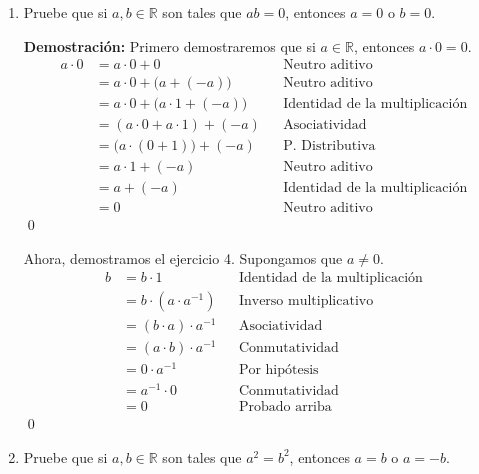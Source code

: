 \documentclass[11pt]{article}
\newcommand{\R}{\mathbb{R}}
\begin{document}
\begin{enumerate}
\pagebreak

\item Pruebe que si $a,b\in \R$ son tales que $ab=0$, entonces $a=0$ o $b=0$.

\textbf{Demostración:} Primero demostraremos que si $a\in \R$, entonces $a\cdot 0=0$.
\begin{align*}
  a\cdot0&=a\cdot0+0 && \text{Neutro aditivo}\\
  &=a\cdot0+\bigl(a+\left(-a\right)\bigr) && \text{Neutro aditivo}\\
  &=a\cdot0+\bigl(a\cdot1+\left(-a\right)\bigr) && \text{Identidad de la multiplicación}\\
  &=\left(a\cdot0+a\cdot1\right)+\left(-a\right) && \text{Asociatividad}\\
  &=\bigl(a\cdot\left(0+1\right)\bigr)+\left(-a\right) && \text{P. Distributiva}\\
  &=a\cdot1+\left(-a\right) && \text{Neutro aditivo}\\
  &=a+\left(-a\right) && \text{Identidad de la multiplicación}\\
  &=0 && \text{Neutro aditivo}
\end{align*} \qed

Ahora, demostramos el ejercicio 4. Supongamos que $a\neq 0$. \begin{align*}
  b &= b \cdot 1	&& \text{Identidad de la multiplicación} \\
  &= b \cdot  \left(a \cdot a^{-1}  \right) 	&& \text{Inverso multiplicativo} \\
  &= \left(b \cdot a \right)  \cdot a^{-1}	&& \text{Asociatividad} \\
  &= \left(a \cdot b \right)  \cdot a^{-1}	&& \text{Conmutatividad} \\
  &= 0 \cdot a^{-1}	&& \text{Por hipótesis}\\
  &= a^{-1} \cdot 0	&& \text{Conmutatividad}\\
  &= 0 && \text{Probado arriba}
\end{align*} \qed

\item Pruebe que si $a,b\in \R$ son tales que $a^2=b^2$, entonces $a=b$ o $a=-b$.


\end{enumerate}
\end{document}
